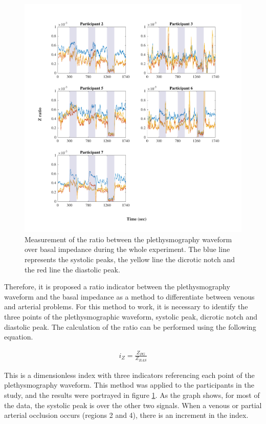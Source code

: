 \begin{figure}[!htpb]
	\includegraphics[width=1\textwidth,keepaspectratio]{figure_apa_8}    
	\caption[Ratio of the plethysmography waveform over basal impedance during the experiment]{Measurement of the ratio between the plethysmography waveform over basal impedance during the whole experiment. The blue line represents the systolic peaks, the yellow line the dicrotic notch and the red line the diastolic peak.}
	\label{fig:ratio Z}
\end{figure}

Therefore, it is proposed a ratio indicator between the plethysmography waveform and the basal impedance as a method to differentiate between venous and arterial problems. For this method to work, it is necessary to identify the three points of the plethysmographic waveform, systolic peak, dicrotic notch and diastolic peak. The calculation of the ratio can be performed using the following equation.

\begin{align}
	\label{eq:ratio Z}
	i_Z = \frac{Z_{PG}}{Z_{BAS}}
\end{align}


This is a dimensionless index with three indicators referencing each point of the plethysmography waveform. This method was applied to the participants in the study, and the results were portrayed in figure \ref{fig:ratio Z}. As the graph shows, for most of the data, the systolic peak is over the other two signals. When a venous or partial arterial occlusion occurs (regions 2 and 4), there is an increment in the index. 

